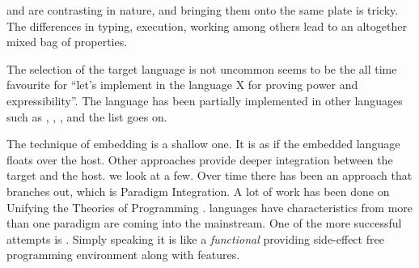 \documentclass[thesis-solanki.tex]{subfiles}
\begin{document}
 and  are contrasting in nature, and
bringing them onto the same plate is tricky.
The differences in typing, execution, working among others lead to an altogether mixed bag of properties.


The selection of the target language is not uncommon\yyy{;}{:}
   seems 
to be the all time favourite for ``let's implement  in
the language X for proving
power and 
expressibility''. The  language has been partially implemented \cite{swipembedd} in other 
languages such as  \cite{racklog},   
\cite{komorowski1982qlog,robinson1982loglisp,robinson1980loglisp},  \cite{wikiprolog, jlog}, 
 \cite{jscriptlog} and the list \cite{yieldprolog} goes on.

The technique of embedding is a shallow one.
It is as if the embedded language floats over the host.
Other approaches provide deeper integration between the target and the host.
we look at a few.
Over time there has been an approach that branches out, which is Paradigm Integration.
A lot of work has been done on Unifying the Theories of Programming
\cite{DBLP:conf/utp/2006,DBLP:conf/utp/2008,DBLP:conf/utp/2010,DBLP:conf/utp/2012,hoare1998unifying,
  gibbons2013unifying}.
 languages  have characteristics from more than one paradigm are coming into the
mainstream.
One of the more successful attempts is \yyy{}{\Verb[showspaces]! !}\cite{website:scala}. Simply speaking it is like a \textit{functional} 
 providing side-effect free programming environment along with 
 features.
\end{document}
